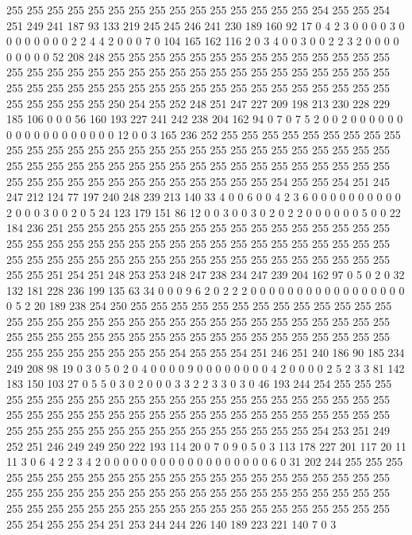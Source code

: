 255 255 255 255 255 255 255 255 255 255 255 255 255 255 255 254 255 255 254 251
249 241 187 93 133 219 245 245 246 241 230 189 160 92 17 0 4 2 3 0
0 0 0 3 0 0 0 0 0 0 0 0 2 2 4 4 2 0 0 0
7 0 104 165 162 116 2 0 3 4 0 0 3 0 0 2 2 3 2 0
0 0 0 0 0 0 0 0 52 208 248 255 255 255 255 255 255 255 255 255
255 255 255 255 255 255 255 255 255 255 255 255 255 255 255 255 255 255 255 255
255 255 255 255 255 255 255 255 255 255 255 255 255 255 255 255 255 255 255 255
255 255 255 255 255 255 255 255 250 254 255 252 248 251 247 227 209 198 213 230
228 229 185 106 0 0 0 56 160 193 227 241 242 238 204 162 94 0 7 0
7 5 2 0 0 2 0 0 0 0 0 0 0 0 0 0 0 0 0 0
0 0 0 0 12 0 0 3 165 236 252 255 255 255 255 255 255 255 255 255
255 255 255 255 255 255 255 255 255 255 255 255 255 255 255 255 255 255 255 255
255 255 255 255 255 255 255 255 255 255 255 255 255 255 255 255 255 255 255 255
255 255 255 255 255 255 255 255 255 255 255 254 255 255 254 251 245 247 212 124
77 197 240 248 239 213 140 33 4 0 0 6 0 0 4 2 3 6 0 0
0 0 0 0 0 0 0 0 2 0 0 0 3 0 0 2 0 5 24 123
179 151 86 12 0 0 3 0 0 3 0 2 0 2 2 0 0 0 0 0
0 5 0 0 22 184 236 251 255 255 255 255 255 255 255 255 255 255 255 255
255 255 255 255 255 255 255 255 255 255 255 255 255 255 255 255 255 255 255 255
255 255 255 255 255 255 255 255 255 255 255 255 255 255 255 255 255 255 255 255
255 255 255 255 251 254 251 248 253 253 248 247 238 234 247 239 204 162 97 0
5 0 2 0 32 132 181 228 236 199 135 63 34 0 0 0 9 6 2 0
2 2 2 0 0 0 0 0 0 0 0 0 0 0 0 0 0 0 0 0
0 5 2 20 189 238 254 250 255 255 255 255 255 255 255 255 255 255 255 255
255 255 255 255 255 255 255 255 255 255 255 255 255 255 255 255 255 255 255 255
255 255 255 255 255 255 255 255 255 255 255 255 255 255 255 255 255 255 255 255
255 255 255 255 255 255 255 254 255 255 254 251 246 251 240 186 90 185 234 249
208 98 19 0 3 0 5 0 2 0 4 0 0 0 0 9 0 0 0 0
0 0 0 0 4 2 0 0 0 0 2 5 2 3 3 81 142 183 150 103
27 0 5 5 0 3 0 2 0 0 0 3 3 2 2 3 3 0 3 0
46 193 244 254 255 255 255 255 255 255 255 255 255 255 255 255 255 255 255 255
255 255 255 255 255 255 255 255 255 255 255 255 255 255 255 255 255 255 255 255
255 255 255 255 255 255 255 255 255 255 255 255 255 255 255 255 255 255 255 255
254 253 251 249 252 251 246 249 249 250 222 193 114 20 0 7 0 9 0 5
0 3 113 178 227 201 117 20 11 11 3 0 6 4 2 2 3 4 2 0
0 0 0 0 0 0 0 0 0 0 0 0 0 0 0 0 0 6 0 31
202 244 255 255 255 255 255 255 255 255 255 255 255 255 255 255 255 255 255 255
255 255 255 255 255 255 255 255 255 255 255 255 255 255 255 255 255 255 255 255
255 255 255 255 255 255 255 255 255 255 255 255 255 255 255 255 255 255 255 255
255 255 255 254 255 255 254 251 253 244 244 226 140 189 223 221 140 7 0 3
